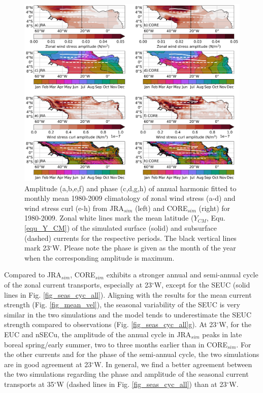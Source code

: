 \documentclass[os, manuscript]{copernicus}
\begin{document}
	\begin{figure}[t]
		\includegraphics[width=12cm]{../../figures/paper/f03_INALT20_wind_taux_curl_AH_5d_clim_1980_2009.png}
		\caption{Amplitude (a,b,e,f) and phase (c,d,g,h) of annual harmonic fitted to monthly mean 1980-2009 climatology of zonal wind stress (a-d)  and wind stress curl (e-h) from JRA$_{sim}$ (left) and CORE$_{sim}$ (right) for 1980-2009. Zonal white lines mark the mean latitude ($ Y_{CM} $, Equ. \ref{equ_Y_CM}) of the simulated surface (solid) and subsurface (dashed) currents for the respective periods. The black vertical lines mark 23$^{\circ}$W. Please note the phase is given as the month of the year when the corresponding amplitude is maximum.}
		\label{fig_harm_fit_curl}
	\end{figure} 
	
	Compared to JRA$_{sim}$, CORE$_{sim}$ exhibits a stronger annual and semi-annual cycle of the zonal current transports, especially at 23$^{\circ}$W, except for the SEUC (solid lines in Fig. \ref{fig_seas_cyc_all}). Aligning with the results for the mean current strength (Fig. \ref{fig_mean_vel}), the seasonal variability of the SEUC is very similar in the two simulations and the model tends to underestimate the SEUC strength compared to observations (Fig. \ref{fig_seas_cyc_all}g). At 23$^{\circ}$W, for the EUC and nSECu, the amplitude of the annual cycle in JRA$_{sim}$ peaks in late boreal spring/early summer, two to three months earlier than in CORE$_{sim}$. For the other currents and for the phase of the semi-annual cycle, the two simulations are in good agreement at 23$^{\circ}$W. In general, we find a better agreement between the two simulations regarding the phase and amplitude of the seasonal current transports at 35$^{\circ}$W (dashed lines in Fig. \ref{fig_seas_cyc_all}) than at 23$^{\circ}$W.
	
\end{document}
